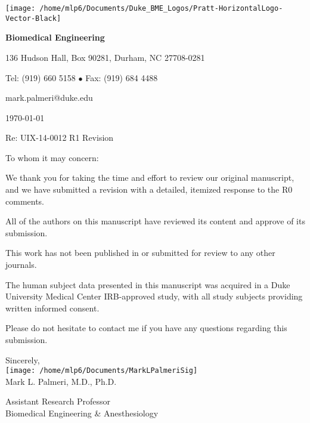 \documentclass[10pt]{article}
\begin{document}
\begin{minipage}[t]{0.5\linewidth}
\vspace{0pt}
\texttt{[image: /home/mlp6/Documents/Duke\_BME\_Logos/Pratt-HorizontalLogo-Vector-Black]}
\end{minipage}\hfill
\begin{minipage}[t]{0.5\linewidth}
\vspace{0pt}
\hfill{\bf Biomedical Engineering}\\

\begin{small}
\hfill 136 Hudson Hall, Box 90281, Durham, NC 27708-0281

\hfill Tel: (919) 660 5158 $\bullet$ Fax: (919) 684 4488

\hfill mark.palmeri@duke.edu\\
\end{small}
\end{minipage}
\begin{Large}

\vspace{0.25in}
\today
\vspace{0.25in}

Re: UIX-14-0012 R1 Revision
\vspace{0.25in}

To whom it may concern:
\vspace{0.1in}

We thank you for taking the time and effort to review our original manuscript,
and we have submitted a revision with a detailed, itemized response to the R0
comments.

All of the authors on this manuscript have reviewed its content and approve of
its submission.  

This work has not been published in or submitted for review to any other
journals.  

The human subject data presented in this manuscript was acquired in a Duke
University Medical Center IRB-approved study, with all study subjects providing
written informed consent.

Please do not hesitate to contact me if you have any questions regarding this
submission.

\vspace{0.25in}

Sincerely,\\
\texttt{[image: /home/mlp6/Documents/MarkLPalmeriSig]}\\
Mark L. Palmeri, M.D., Ph.D.\\
\end{Large}
Assistant Research Professor\\
Biomedical Engineering \& Anesthesiology
\end{document}
